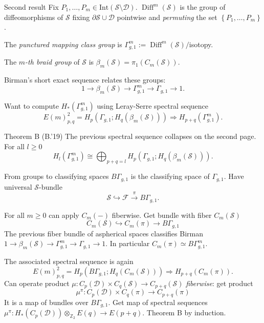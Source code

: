 \documentclass[10pt]{beamer}
\newcommand{\Z}{\mathbb{Z}}
\newcommand{\cF}{\mathcal{F}}
\newcommand{\D}{\mathcal{D}}
\renewcommand{\S}{\mathcal{S}}
\renewcommand{\gg}{\Gamma_{g,1}}
\newcommand{\ggm}{\Gamma_{g,1}^m}
\newcommand{\set}[1]{\left\{#1\right\}}
\newcommand{\pa}[1]{\left(#1\right)}
\DeclareMathOperator{\Diff}{Diff}
\begin{document}
\begin{frame}{Second result}
Fix $P_1,\dots, P_m\in \mathrm{Int}(\S\setminus\D)$. $\Diff^m(\S)$ is the group of
diffeomorphisms of $\S$ fixing $\partial\S\cup\D$ pointwise 
and \emph{permuting} the set $\set{P_1,\dots, P_m}$.

The \emph{punctured mapping class group} is $\ggm:=\Diff^m(\S)/$isotopy.

\pause
The \emph{$m$-th braid group} of $\S$ is $\beta_m(\S)=\pi_1(C_m(\S))$.

\pause
\vspace{0.1cm}
Birman's short exact sequence relates these groups:
\[
 1\to\beta_m(\S)\to\ggm\to\gg\to 1.
\]

\pause
Want to compute $H_*(\ggm)$ using Leray-Serre spectral sequence
\[
 E(m)^2_{p,q}=H_p\pa{\gg;H_q\pa{\beta_m(\S)}} \Rightarrow H_{p+q}\pa{\ggm}.
\]
\pause
\begin{block}{Theorem B (B.'19)}
The previous spectral sequence collapses on the second page. For all $l\geq 0$
\[
 H_l\pa{\ggm}\cong \bigoplus_{p+q=l} H_p\pa{\gg;H_q\pa{\beta_m(\S)}}.
\]
\end{block}
\end{frame}

\begin{frame}{From groups to classifying spaces}
$B\gg$ is the classifying space of $\gg$.
Have universal $\S$-bundle
\[
\S\hookrightarrow  \cF \overset{\pi}{\to} B\gg.
\]

\pause
For all $m\geq 0$ can apply $C_m(-)$ fiberwise. Get bundle with fiber $C_m(\S)$
\[
 C_m(\S)\hookrightarrow C_m(\pi)\to B\gg
\]
\pause
The previous fiber bundle of aspherical spaces classifies Birman $1\to\beta_m(\S)\to\ggm\to\gg\to 1$.
In particular $C_m(\pi)\simeq B\ggm$.

\pause
The associated spectral sequence is again 
\[
E(m)^2_{p,q}=H_p\pa{B\gg;H_q\pa{C_m(\S)}} \Rightarrow H_{p+q}\pa{C_m(\pi)}.
\]
\pause
Can operate product $\mu\colon C_p(\D)\times C_q(\S)\to C_{p+q}(\S)$ \emph{fiberwise}: get product
\[
 \mu^{\pi}\colon C_p(\D)\times C_q(\pi)\to C_{p+q}(\pi)
\]
\pause
It is a map of bundles over $B\gg$. Get map of spectral sequences $\mu^{\pi}\colon H_*(C_p(\D))\otimes_{\Z_2} E(q)\to E(p+q)$.
Theorem B by induction.
\end{frame}
\end{document}
